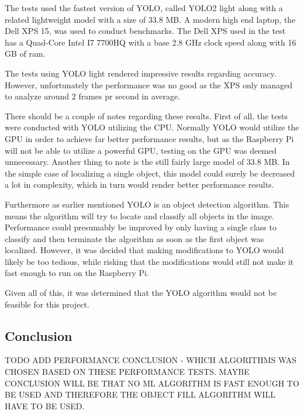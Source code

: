 The tests used the fastest version of YOLO, called YOLO2 light along with a related lightweight model with a size of 33.8 MB. 
A modern high end laptop, the Dell XPS 15, was used to conduct benchmarks.
The Dell XPS used in the test has a Quad-Core Intel I7 7700HQ with a base 2.8 GHz clock speed along with 16 GB of ram.

The tests using YOLO light rendered impressive results regarding accuracy.
However, unfortunately the performance was no good as the XPS only managed to analyze around 2 frames pr second in average.

There should be a couple of notes regarding these results.
First of all, the tests were conducted with YOLO utilizing the CPU.
Normally YOLO would utilize the GPU in order to achieve far better performance results, but as the Raspberry Pi will not be able to utilize a powerful GPU, testing on the GPU was deemed unnecessary. 
Another thing to note is the still fairly large model of 33.8 MB.
In the simple case of localizing a single object, this model could surely be decreased a lot in complexity, which in turn would render better performance results.

Furthermore as earlier mentioned YOLO is an object detection algorithm.
This means the algorithm will try to locate and classify all objects in the image.
Performance could presumably be improved by only having a single class to classify and then terminate the algorithm as soon as the first object was localized.
However, it was decided that making modifications to YOLO would likely be too tedious, while risking that the modifications would still not make it fast enough to run on the Raspberry Pi.

Given all of this, it was determined that the YOLO algorithm would not be feasible for this project.

\subsection{Conclusion}
TODO ADD PERFORMANCE CONCLUSION - WHICH ALGORITHMS WAS CHOSEN BASED ON THESE PERFORMANCE TESTS. 
MAYBE CONCLUSION WILL BE THAT NO ML ALGORITHM IS FAST ENOUGH TO BE USED AND THEREFORE THE OBJECT FILL ALGORITHM WILL HAVE TO BE USED.